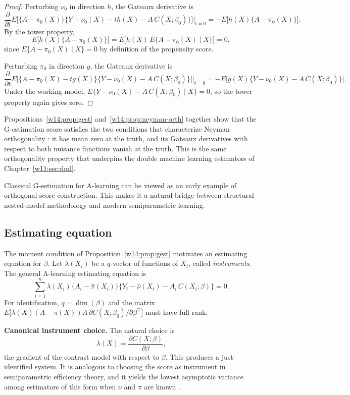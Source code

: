 \documentclass[master.tex]{subfiles}
\begin{document}
\begin{proof}
Perturbing \(\nu_0\) in direction \(h\), the Gateaux derivative is
\[
\frac{\partial}{\partial t}
E\bigl[\{A-\pi_0(X)\}\{Y-\nu_0(X)-th(X)-A\,C(X;\beta_0)\}\bigr]\big|_{t=0}
= -E\bigl[h(X)\{A-\pi_0(X)\}\bigr].
\]
By the tower property,
\[
E\bigl[h(X)\{A-\pi_0(X)\}\bigr]
=E\bigl[h(X)\,E\{A-\pi_0(X)\mid X\}\bigr]=0,
\]
since \(E\{A-\pi_0(X)\mid X\}=0\) by definition of the propensity score.

Perturbing \(\pi_0\) in direction \(g\), the Gateaux derivative is
\[
\frac{\partial}{\partial t}
E\bigl[\{A-\pi_0(X)-tg(X)\}\{Y-\nu_0(X)-A\,C(X;\beta_0)\}\bigr]\big|_{t=0}
= -E\bigl[g(X)\{Y-\nu_0(X)-A\,C(X;\beta_0)\}\bigr].
\]
Under the working model, \(E\{Y-\nu_0(X)-A\,C(X;\beta_0)\mid X\}=0\),
so the tower property again gives zero.
\end{proof}

Propositions~\ref{w14:prop:gest} and~\ref{w14:prop:neyman-orth} together show that the G-estimation score satisfies the two conditions that characterize Neyman orthogonality \citep{chernozhukov2018double}: it has mean zero at the truth, and its Gateaux derivatives with respect to both nuisance functions vanish at the truth. This is the same orthogonality property that underpins the double machine learning estimators of Chapter~\ref{w11:sec:dml}.

\begin{remark}
Classical G-estimation for A-learning can be viewed as an early example of orthogonal-score construction. This makes it a natural bridge between structural nested-model methodology and modern semiparametric learning.
\end{remark}

\subsection{Estimating equation}

The moment condition of Proposition~\ref{w14:prop:gest} motivates an
estimating equation for \(\beta\). Let \(\lambda(X_i)\) be a
\(q\)-vector of functions of \(X_i\), called \emph{instruments}. The general
A-learning estimating equation is
\[
\sum_{i=1}^n \lambda(X_i)\{A_i-\hat\pi(X_i)\}
\bigl\{Y_i-\hat\nu(X_i)-A_i\,C(X_i;\beta)\bigr\}=0.
\]
For identification, \(q=\dim(\beta)\) and the matrix
\(E\bigl[\lambda(X)(A-\pi(X))A\,\partial C(X;\beta_0)/\partial\beta^\top\bigr]\)
must have full rank.

\medskip\noindent\textbf{Canonical instrument choice.}
The natural choice is
\[
\lambda(X)=\frac{\partial C(X;\beta)}{\partial\beta},
\]
the gradient of the contrast model with respect to \(\beta\). This produces
a just-identified system. It is analogous to choosing the score as
instrument in semiparametric efficiency theory, and it yields the lowest
asymptotic variance among estimators of this form when \(\nu\) and \(\pi\)
are known \citep{murphy2003optimal}.
\end{document}

